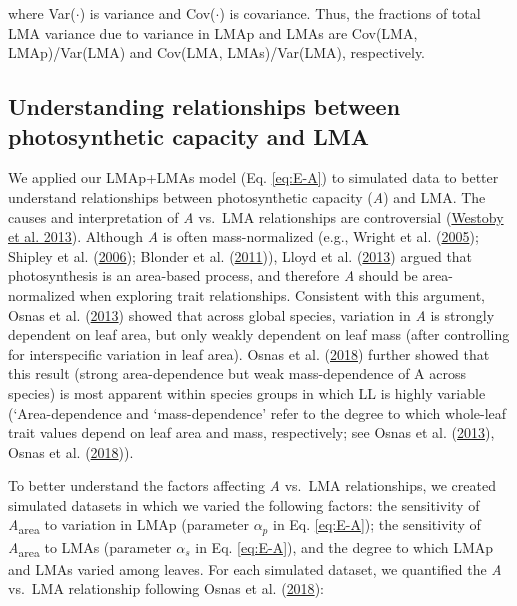 \documentclass[
  12pt,
]{article}
\begin{document}
where Var(\(\cdot\)) is variance and Cov(\(\cdot\)) is covariance.
Thus, the fractions of total LMA variance due to variance in LMAp and LMAs are Cov(LMA, LMAp)/Var(LMA) and Cov(LMA, LMAs)/Var(LMA), respectively.

\hypertarget{understanding-relationships-between-photosynthetic-capacity-and-lma}{%
\subsection{Understanding relationships between photosynthetic capacity and LMA}\label{understanding-relationships-between-photosynthetic-capacity-and-lma}}

We applied our LMAp+LMAs model (Eq. \eqref{eq:E-A}) to simulated data to better understand relationships between photosynthetic capacity (\emph{A}) and LMA.
The causes and interpretation of \emph{A} vs.~LMA relationships are controversial (\protect\hyperlink{ref-Westoby2013}{Westoby et al. 2013}).
Although \emph{A} is often mass-normalized (e.g., Wright et al. (\protect\hyperlink{ref-Wright2005}{2005}); Shipley et al. (\protect\hyperlink{ref-Shipley2006}{2006}); Blonder et al. (\protect\hyperlink{ref-Blonder2011}{2011})), Lloyd et al. (\protect\hyperlink{ref-Lloyd2013}{2013}) argued that photosynthesis is an area-based process, and therefore \emph{A} should be area-normalized when exploring trait relationships.
Consistent with this argument, Osnas et al. (\protect\hyperlink{ref-Osnas2013}{2013}) showed that across global species, variation in \emph{A} is strongly dependent on leaf area, but only weakly dependent on leaf mass (after controlling for interspecific variation in leaf area).
Osnas et al. (\protect\hyperlink{ref-Osnas2018}{2018}) further showed that this result (strong area-dependence but weak mass-dependence of A across species) is most apparent within species groups in which LL is highly variable (`Area-dependence and `mass-dependence' refer to the degree to which whole-leaf trait values depend on leaf area and mass, respectively; see Osnas et al. (\protect\hyperlink{ref-Osnas2013}{2013}), Osnas et al. (\protect\hyperlink{ref-Osnas2018}{2018})).

To better understand the factors affecting \emph{A} vs.~LMA relationships, we created simulated datasets in which we varied the following factors: the sensitivity of \emph{A}\textsubscript{area} to variation in LMAp (parameter \(\alpha_p\) in Eq. \eqref{eq:E-A}); the sensitivity of \emph{A}\textsubscript{area} to LMAs (parameter \(\alpha_s\) in Eq. \eqref{eq:E-A}), and the degree to which LMAp and LMAs varied among leaves.
For each simulated dataset, we quantified the \emph{A} vs.~LMA relationship following Osnas et al. (\protect\hyperlink{ref-Osnas2018}{2018}):
\end{document}
